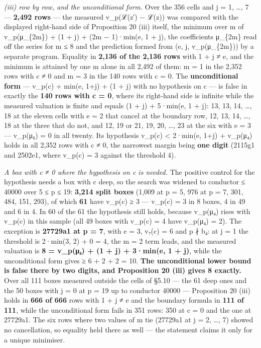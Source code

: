 \documentclass[11pt,a4paper]{article}
\theoremstyle{named}
\begin{document}
\textit{(iii) row by row, and the unconditional form.} Over the 356 cells and j = 1, …, 7 — \textbf{2,492 rows} — the measured v\_p(ℒ(z′) − ℒ(z)) was compared with the displayed right-hand side of Proposition 20 (iii) itself, the minimum over m of v\_p(μ\_\{2m\}) + (1 + j) + (2m − 1)·min(e, 1 + j), the coefficients μ\_\{2m\} read off the series for m ≤ 8 and the prediction formed from (e, j, v\_p(μ\_\{2m\})) by a separate program. Equality in \textbf{2,136 of the 2,136 rows} with 1 + j ≠ e, and the minimum is attained by one m alone in all 2,492 of them: m = 1 in the 2,352 rows with c ≠ 0 and m = 3 in the 140 rows with c = 0. The \textbf{unconditional form} — v\_p(c) + min(e, 1+j) + (1 + j) with no hypothesis on c — is false in exactly the \textbf{140 rows with c = 0}, where its right-hand side is infinite while the measured valuation is finite and equals (1 + j) + 5·min(e, 1 + j): 13, 13, 14, …, 18 at the eleven cells with e = 2 that cancel at the boundary row, 12, 13, 14, …, 18 at the three that do not, and 12, 19 or 21, 19, 20, …, 23 at the six with e = 3 — v\_p(μ₆) = 0 in all twenty. Its hypothesis v\_p(c) \textless{} 2·min(e, 1+j) + v\_p(μ₄) holds in all 2,352 rows with c ≠ 0, the narrowest margin being \textbf{one digit} (2115g1 and 2502e1, where v\_p(c) = 3 against the threshold 4).

\textit{A box with c ≠ 0 where the hypothesis on c is needed.} The positive control for the hypothesis needs a box with c deep, so the search was widened to conductor ≤ 40000 over 5 ≤ p ≤ 19: \textbf{3,214 split boxes} (1,009 at p = 5, 976 at p = 7, 301, 484, 151, 293), of which \textbf{61} have v\_p(c) ≥ 3 — v\_p(c) = 3 in 8 boxes, 4 in 49 and 6 in 4. In 60 of the 61 the hypothesis still holds, because v\_p(μ₄) rises with v\_p(c) in this sample (all 49 boxes with v\_p(c) = 4 have v\_p(μ₄) = 2). The exception is \textbf{27729a1 at p = 7}, with e = 3, v₇(c) = 6 and p ∤ b₄: at j = 1 the threshold is 2·min(3, 2) + 0 = 4, the m = 2 term leads, and the measured valuation is \textbf{8 = v\_p(μ₄) + (1 + j) + 3·min(e, 1 + j)}, while the unconditional form gives ≥ 6 + 2 + 2 = 10. \textbf{The unconditional lower bound is false there by two digits, and Proposition 20 (iii) gives 8 exactly.} Over all 111 boxes measured outside the cells of §5.10 — the 61 deep ones and the 50 boxes with j = 0 at p = 19 up to conductor 40000 — Proposition 20 (iii) holds in \textbf{666 of 666} rows with 1 + j ≠ e and the boundary formula in \textbf{111 of 111}, while the unconditional form fails in 351 rows: 350 at c = 0 and the one at 27729a1. The six rows where two values of m tie (27729a1 at j = 2, …, 7) showed no cancellation, so equality held there as well — the statement claims it only for a unique minimiser.
\end{document}
